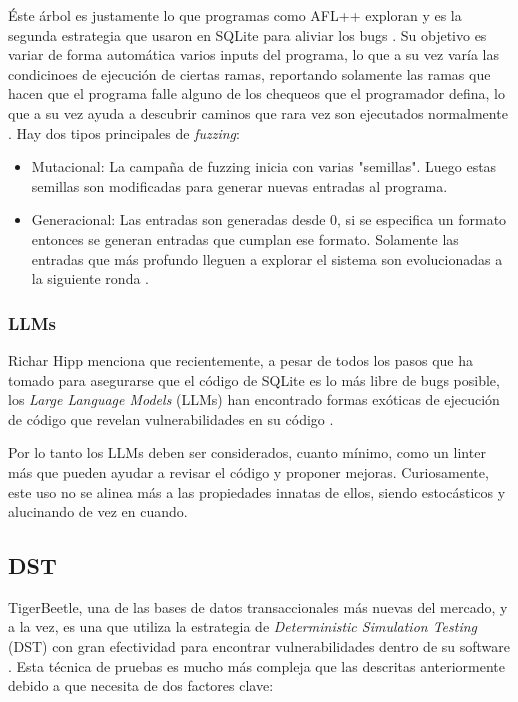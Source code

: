   Éste árbol es justamente lo que programas como AFL++ exploran y es la segunda estrategia que usaron en SQLite para aliviar los bugs \cite{software_should_work_2026}. Su objetivo es variar de forma automática varios inputs del programa, lo que a su vez varía las condicinoes de ejecución de ciertas ramas, reportando solamente las ramas que hacen que el programa falle alguno de los chequeos que el programador defina, lo que a su vez ayuda a descubrir caminos que rara vez son ejecutados normalmente \cite{bohme2020fuzzing}. Hay dos tipos principales de \textit{fuzzing}:
	\begin{itemize}
\item Mutacional: La campaña de fuzzing inicia con varias "semillas". Luego estas semillas son modificadas para generar nuevas entradas al programa.
		\item Generacional: Las entradas son generadas desde 0, si se especifica un formato entonces se generan entradas que cumplan ese formato. Solamente las entradas que más profundo lleguen a explorar el sistema son evolucionadas a la siguiente ronda \cite{bohme2020fuzzing}.
	\end{itemize}

  \subsubsection{LLMs}
	Richar Hipp menciona que recientemente, a pesar de todos los pasos que ha tomado para asegurarse que el código de SQLite es lo más libre de bugs posible, los \textit{Large Language Models} (LLMs) han encontrado formas exóticas de ejecución de código que revelan vulnerabilidades en su código \cite{software_should_work_2026}.

  Por lo tanto los LLMs deben ser considerados, cuanto mínimo, como un linter más que pueden ayudar a revisar el código y proponer mejoras. Curiosamente, este uso no se alinea más a las propiedades innatas de ellos, siendo estocásticos y alucinando de vez en cuando.

	\subsection{DST}
	TigerBeetle, una de las bases de datos transaccionales más nuevas del mercado, y a la vez, es una que utiliza la estrategia de \textit{Deterministic Simulation Testing} (DST) con gran efectividad para encontrar vulnerabilidades dentro de su software \cite{greef-2023}. Esta técnica de pruebas es mucho más compleja que las descritas anteriormente debido a que necesita de dos factores clave:

